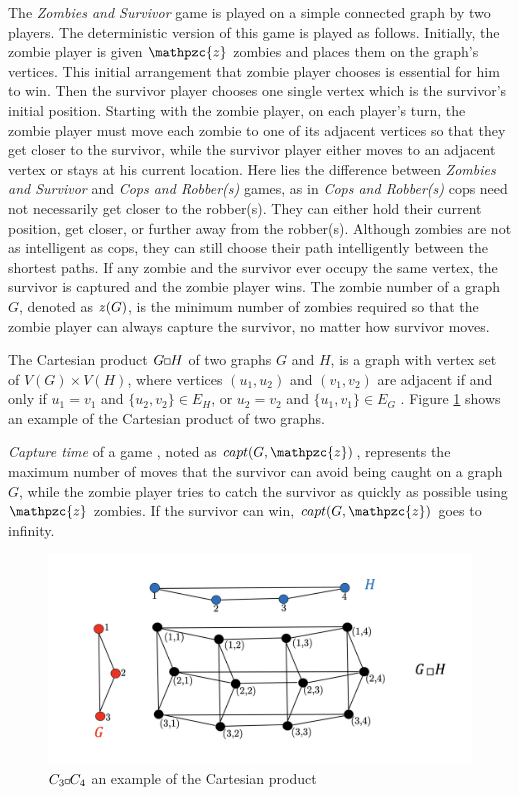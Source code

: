 \documentclass[1p]{elsarticle}
\newcommand{\zn}{\ooalign{$z$\cr\hfil\rule[.5ex]{.2em}{.08ex}\hfil\cr}}
\newcommand{\sq}[1][black]{%
\begin{tikzpicture}                                                           
  \draw[#1] (2pt,0pt) -- (6pt,0pt);   
  \draw[#1] (2pt,0pt) -- (2pt,4pt);    
  \draw[#1] (2pt,4pt) -- (6pt,4pt);   
  \draw[#1] (6pt,0pt) -- (6pt,4pt);
\end{tikzpicture}%
}
\newcommand{\sqSmall}[1][black]{%
\begin{tikzpicture}                                                           
  \draw[#1] (1.5pt,0pt) -- (4.5pt,0pt);   
  \draw[#1] (1.5pt,0pt) -- (1.5pt,3pt);    
  \draw[#1] (1.5pt,3pt) -- (4.5pt,3pt);   
  \draw[#1] (4.5pt,0pt) -- (4.5pt,3pt);
\end{tikzpicture}%
}
\begin{document}
The {\it Zombies and Survivor} game is played on a simple connected graph by two players. The deterministic version of
this game \cite{Fitz16} is played as follows. Initially, the zombie player is given $\mathpzc{z}$ zombies and places
them on the graph's vertices. This initial arrangement that zombie player chooses is essential for him to win.  Then the
survivor player chooses one single vertex which is the survivor's initial position. Starting with the zombie player, on
each player's turn, the zombie player must move each zombie to one of its adjacent vertices so that they get closer to
the survivor, while the survivor player either moves to an adjacent vertex or stays at his current location. Here lies
the difference between {\it Zombies and Survivor} and {\it Cops and Robber(s)} games, as in {\it Cops and Robber(s)}
cops need not necessarily get closer to the robber(s). They can either hold their current position, get closer, or
further away from the robber(s). Although zombies are not as intelligent as cops, they can still choose their path
intelligently between the shortest paths. If any zombie and the survivor ever occupy the same vertex, the survivor is
captured and the zombie player wins. The zombie number of a graph $G$, denoted as $\zn(G)$, is the minimum number of
zombies required so that the zombie player can always capture the survivor, no matter how survivor moves.

The Cartesian product $G \sq H$ of two graphs $G$ and $H$, is a graph with vertex set of $V(G) \times V(H)$, where
vertices $(u_1 , u_2)$ and $(v_1 , v_2)$ are adjacent if and only if $u_1 = v_1$ and $ \{ u_2 , v_2 \} \in E_{H} $, or
$u_2 = v_2$ and $ \{u_1 , v_1 \} \in E_{G}$ \cite{West02}. Figure \ref{fig:p2} shows an example of the Cartesian product
of two graphs.

{\it Capture time} of a game \cite{Bonato09}, noted as $capt(G,\mathpzc{z})$, represents the maximum number of moves
that the survivor can avoid being caught on a graph $G$, while the zombie player tries to catch the survivor as quickly
as possible using $\mathpzc{z}$ zombies. If the survivor can win, $capt(G,\mathpzc{z})$ goes to infinity.

\begin{figure}[h!]
	\centering
	\includegraphics[width=0.9\linewidth]{CpWest.png}
	\caption{$C_3 \sqSmall C_4$ an example of the Cartesian product}
	\label{fig:p2}
\end{figure}
\end{document}
